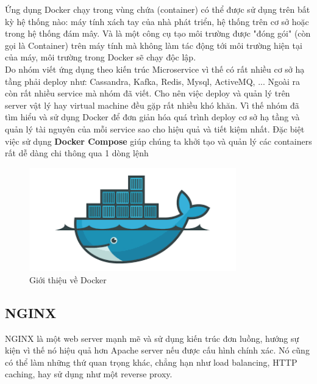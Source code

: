             Ứng dụng Docker chạy trong vùng chứa (container) có thể được sử dụng trên bất kỳ hệ thống nào: máy tính xách tay của nhà phát triển, hệ thống trên cơ sở hoặc trong hệ thống đám mây. Và là một công cụ tạo môi trường được "đóng gói" (còn gọi là Container) trên máy tính mà không làm tác động tới môi trường hiện tại của máy, môi trường trong Docker sẽ chạy độc lập.\\
            
            Do nhóm viết ứng dụng theo kiến trúc Microservice vì thế có rất nhiều cơ sở hạ tầng phải deploy như: Cassandra, Kafka, Redis, Mysql, ActiveMQ, ... Ngoài ra còn rất nhiều service mà nhóm đã viết. Cho nên việc deploy và quản lý trên server vật lý hay virtual machine đều gặp rất nhiều khó khăn. Vì thế nhóm đã tìm hiểu và sử dụng Docker để đơn giản hóa quá trình deploy cơ sở hạ tầng và quản lý tài nguyên của mỗi service sao cho hiệu quả và tiết kiệm nhất. Đặc biệt việc sử dụng \textbf{Docker Compose} giúp chúng ta khởi tạo và quản lý các containers rất dễ dàng chi thông qua 1 dòng lệnh
            
			 \begin{figure}[H]
            	\includegraphics[width=0.8\textwidth]{Images/docker.png}
            	\centering
            	\linebreak
            	\caption{Giới thiệu về Docker}
            \end{figure}
            
            
            \subsection{NGINX}
            
            NGINX \cite{nginx} là một web server mạnh mẽ và sử dụng kiến trúc đơn luồng, hướng sự kiện vì thế nó hiệu quả hơn Apache server nếu được cấu hình chính xác. Nó cũng có thể làm những thứ quan trọng khác, chẳng hạn như load balancing, HTTP caching, hay sử dụng như một reverse proxy.\\
            

